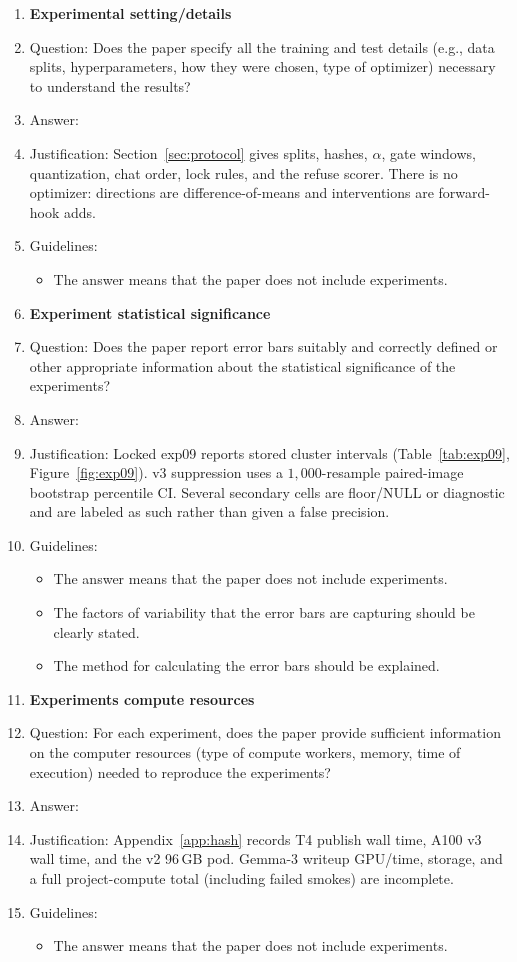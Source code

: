 \begin{enumerate}
\item {\bf Experimental setting/details}
\item[] Question: Does the paper specify all the training and test details (e.g., data splits, hyperparameters, how they were chosen, type of optimizer) necessary to understand the results?
\item[] Answer: \answerYes{}
\item[] Justification: Section~\ref{sec:protocol} gives splits, hashes, $\alpha$, gate windows, quantization, chat order, lock rules, and the refuse scorer. There is no optimizer: directions are difference-of-means and interventions are forward-hook adds.
\item[] Guidelines:
\begin{itemize}
\item The answer \answerNA{} means that the paper does not include experiments.
\end{itemize}

\item {\bf Experiment statistical significance}
\item[] Question: Does the paper report error bars suitably and correctly defined or other appropriate information about the statistical significance of the experiments?
\item[] Answer: \answerYes{}
\item[] Justification: Locked exp09 reports stored cluster intervals (Table~\ref{tab:exp09}, Figure~\ref{fig:exp09}). v3 suppression uses a $1{,}000$-resample paired-image bootstrap percentile CI. Several secondary cells are floor/NULL or diagnostic and are labeled as such rather than given a false precision.
\item[] Guidelines:
\begin{itemize}
\item The answer \answerNA{} means that the paper does not include experiments.
\item The factors of variability that the error bars are capturing should be clearly stated.
\item The method for calculating the error bars should be explained.
\end{itemize}

\item {\bf Experiments compute resources}
\item[] Question: For each experiment, does the paper provide sufficient information on the computer resources (type of compute workers, memory, time of execution) needed to reproduce the experiments?
\item[] Answer: \answerNo{}
\item[] Justification: Appendix~\ref{app:hash} records T4 publish wall time, A100 v3 wall time, and the v2 96\,GB pod. Gemma-3 writeup GPU/time, storage, and a full project-compute total (including failed smokes) are incomplete.
\item[] Guidelines:
\begin{itemize}
\item The answer \answerNA{} means that the paper does not include experiments.
\end{itemize}


\end{enumerate}
